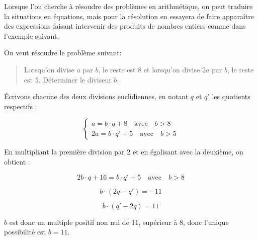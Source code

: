 \medskip

\begin{remarque}
	Lorsque l'on  cherche à résoudre des problèmes en arithmétique, on peut traduire la situations en équations, mais pour la résolution en essayera de faire apparaître des expressions faisant intervenir des produits de nombres entiers comme dans l'exemple suivant.
\end{remarque}

\medskip

\begin{exemple}
	On veut résoudre le problème suivant:
	
	\begin{quote}
		Lorsqu'on divise $a$ par $b$, le reste est 8 et lorsqu'on divise $2a$ par $b$, le reste est 5. Déterminer le diviseur $b$.
	\end{quote} 
	
	
	Écrivons chacune des deux divisions euclidiennes, en notant $q$ et $q'$ les quotients respectifs :
	
	$$\begin{cases} a = b \cdot q + 8 \quad \text{avec} \quad b > 8 \\ 2a = b \cdot q' + 5 \quad \text{avec} \quad b > 5 \end{cases}$$
	
	En multipliant la première division par 2 et en égalisant avec la deuxième, on obtient :
	
	$$2b \cdot q + 16 = b \cdot q' + 5 \quad \text{avec} \quad b > 8$$
	
	$$b \cdot (2q - q') = -11$$
	
	$$b \cdot (q' - 2q) = 11$$
	
	$b$ est donc un multiple positif non nul de 11, supérieur à 8, donc l'unique possibilité est $b = 11$.
\end{exemple}


